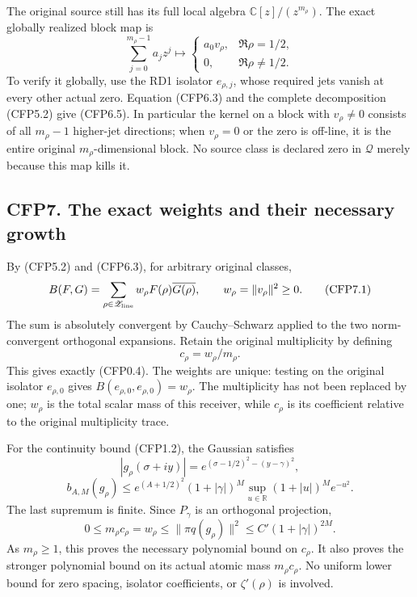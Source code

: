 The original source still has its full local algebra
\(\mathbb C[z]/(z^{m_\rho})\). The exact globally realized block map is
\[
\sum_{j=0}^{m_\rho-1}a_jz^j\longmapsto
\begin{cases}a_0v_\rho,&\Re\rho=1/2,\\0,&\Re\rho\ne1/2.\end{cases}
\tag{CFP6.5}
\] To verify it globally, use the RD1 isolator \(e_{\rho,j}\), whose
required jets vanish at every other actual zero. Equation (CFP6.3) and
the complete decomposition (CFP5.2) give (CFP6.5). In particular the
kernel on a block with \(v_\rho\ne0\) consists of all \(m_\rho-1\)
higher-jet directions; when \(v_\rho=0\) or the zero is off-line, it is
the entire original \(m_\rho\)-dimensional block. No source class is
declared zero in \(\mathcal Q\) merely because this map kills it.

\subsection{CFP7. The exact weights and their necessary
growth}\label{cfp7.-the-exact-weights-and-their-necessary-growth}

By (CFP5.2) and (CFP6.3), for arbitrary original classes, \[
B(F,G)=\sum_{\rho\in\mathscr Z_{\rm line}}
w_\rho F(\rho)\overline{G(\rho)},
\qquad w_\rho=\|v_\rho\|^2\ge0.
\tag{CFP7.1}
\] The sum is absolutely convergent by Cauchy--Schwarz applied to the
two norm-convergent orthogonal expansions. Retain the original
multiplicity by defining \[
c_\rho=w_\rho/m_\rho.
\tag{CFP7.2}
\] This gives exactly (CFP0.4). The weights are unique: testing on the
original isolator \(e_{\rho,0}\) gives
\(B(e_{\rho,0},e_{\rho,0})=w_\rho\). The multiplicity has not been
replaced by one; \(w_\rho\) is the total scalar mass of this receiver,
while \(c_\rho\) is its coefficient relative to the original
multiplicity trace.

For the continuity bound (CFP1.2), the Gaussian satisfies \[
|g_\rho(\sigma+iy)|=e^{(\sigma-1/2)^2-(y-\gamma)^2},
\] \[
b_{A,M}(g_\rho)\le
e^{(A+1/2)^2}(1+|\gamma|)^M
\sup_{u\in\mathbb R}(1+|u|)^M e^{-u^2}.
\tag{CFP7.3}
\] The last supremum is finite. Since \(P_\gamma\) is an orthogonal
projection, \[
0\le m_\rho c_\rho=w_\rho
\le\|\pi q(g_\rho)\|^2
\le C'(1+|\gamma|)^{2M}.
\tag{CFP7.4}
\] As \(m_\rho\ge1\), this proves the necessary polynomial bound on
\(c_\rho\). It also proves the stronger polynomial bound on its actual
atomic mass \(m_\rho c_\rho\). No uniform lower bound for zero spacing,
isolator coefficients, or \(\zeta'(\rho)\) is involved.

